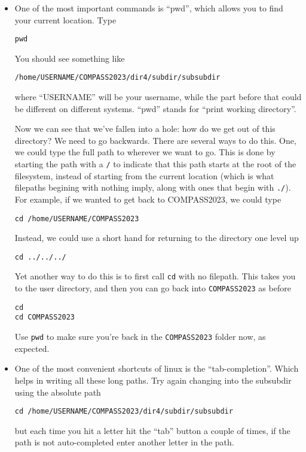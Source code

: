 \documentclass[aps,showpacs,prd,notitlepage,preprintnumbers,amsmath,amssymb,letterpaper]{revtex4}
\begin{document}
\begin{itemize}
\item One of the most
important commands is ``pwd'', which allows you to find your current
location. Type

\begin{verbatim}
pwd
\end{verbatim}

You should see something like

\begin{verbatim}
/home/USERNAME/COMPASS2023/dir4/subdir/subsubdir
\end{verbatim}

where ``USERNAME'' will be your username, while the part before that could be different on different systems. ``pwd'' stands for ``print working directory''.

Now we can see that we've fallen into a hole: how do we get out of this directory? We need to go backwards.
There are several ways to do this.
One, we could type the full path to wherever we want to go. This is done by starting the path with a \verb|/| to indicate that this path starts at the root of the filesystem, instead of starting from the current location (which is what filepaths begining with nothing imply, along with ones that begin with \verb|./|).
For example, if we wanted to get back to COMPASS2023, we could type

\begin{verbatim}
cd /home/USERNAME/COMPASS2023
\end{verbatim}

        Instead, we could use a short hand for returning to the directory one level up
\begin{verbatim}
cd ../../../
\end{verbatim}

        Yet another way to do this is to first call \verb|cd| with no filepath. This takes you to the user directory, and then you can go back into \verb|COMPASS2023| as before

\begin{verbatim}
cd
cd COMPASS2023
\end{verbatim}

        Use \verb|pwd| to make sure you're back in the \verb|COMPASS2023| folder now, as expected.

\item One of the most convenient shortcuts of linux is the
  ``tab-completion''. Which helps in writing all these long paths.
  Try again changing into the subsubdir using the absolute path

\begin{verbatim}
cd /home/USERNAME/COMPASS2023/dir4/subdir/subsubdir
\end{verbatim}

but each time you hit a letter hit the ``tab'' button a couple of
times, if the path is not auto-completed enter another letter in the
path.

\end{itemize}
\end{document}
